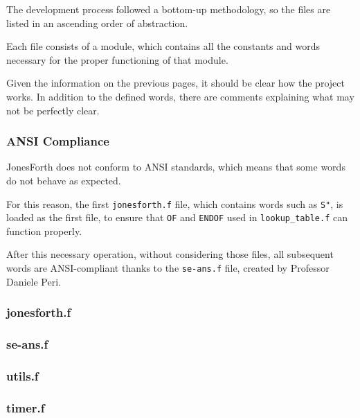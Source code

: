 \documentclass[a4paper, 12pt]{article}
\begin{document}
The development process followed a bottom-up methodology, so the files are listed in an ascending order of abstraction.

Each file consists of a module, which contains all the constants and words necessary for the proper functioning of that module.

Given the information on the previous pages, it should be clear how the project works. In addition to the defined words, there are comments explaining what may not be perfectly clear.

\subsubsection{ANSI Compliance}
JonesForth does not conform to ANSI\cite{ANSICompliance} standards, which means that some words do not behave as expected.

For this reason, the first \texttt{jonesforth.f} file, which contains words such as \texttt{S"}, is loaded as the first file, to ensure that \texttt{OF} and \texttt{ENDOF} used in \texttt{lookup\_table.f} can function properly.

After this necessary operation, without considering those files, all subsequent words are ANSI-compliant thanks to the \texttt{se-ans.f} file, created by Professor Daniele Peri.

\subsubsection{jonesforth.f}

\subsubsection{se-ans.f}

\subsubsection{utils.f}

\subsubsection{timer.f}
\end{document}
